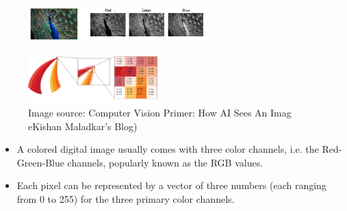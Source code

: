 \begin{vbframe}

 \begin{figure}
    \centering
    \includegraphics[width=7cm]{figure/RGB.jpeg}
  \end{figure}

 \begin{figure}
    \centering
    \includegraphics[width=5cm]{figure/RGB-1.png}
    \caption{\tiny Image source: Computer Vision Primer: How AI Sees An Imag eKishan Maladkar's Blog)}
  \end{figure}

\begin{itemize}
       \item A colored digital image usually comes with three color channels, i.e. the Red-Green-Blue channels, popularly known as the RGB values.   
        \item Each pixel can be represented by a vector of three numbers (each ranging from 0 to 255) for the three primary color channels.
\end{itemize}



  
  
\end{vbframe}



